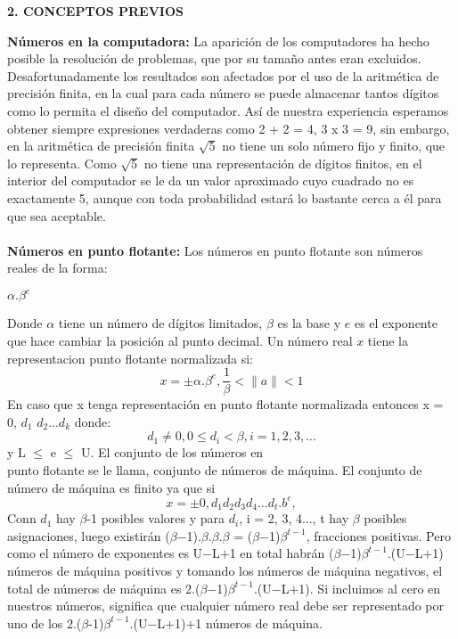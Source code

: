 \documentclass[10pt,a4paper]{article}
\begin{document}
\begin{multicols}{2}
\begin{center}
{\large \bf 2. CONCEPTOS PREVIOS}
\end{center}
\textbf{N\'umeros en la computadora:}
La aparici\'on de los computadores ha hecho posible la resoluci\'on de problemas, que por su tama\~no antes eran excluidos. Desafortunadamente los resultados son afectados por el uso de la aritm\'etica de precisi\'on finita, en la cual para cada n\'umero se puede almacenar tantos d\'igitos como lo permita el dise\~no del computador. As\'i de nuestra experiencia esperamos obtener siempre expresiones verdaderas como 2 + 2 = 4, 3 x 3 = 9, sin embargo, en la aritm\'etica de precisi\'on finita $\sqrt{5}$ no tiene un solo n\'umero fijo y finito, que lo representa. Como $\sqrt{5}$ no tiene una representaci\'on de d\'igitos finitos, en el interior del computador se le da un valor aproximado cuyo cuadrado no es exactamente 5, aunque con toda probabilidad estar\'a lo bastante cerca a \'el para que sea aceptable.\\\\
\textbf{N\'umeros en punto flotante:}
Los n\'umeros en punto flotante son n\'umeros reales de la forma:
\begin{center}{$\alpha$$.$$\beta^{e}$}
\end{center}
Donde $\alpha$ tiene un n\'umero de d\'igitos limitados, $\beta$ es la base y $e$ es el exponente que hace cambiar la posici\'on al punto decimal. Un n\'umero real $x$ tiene la representacion punto flotante normalizada si:
\begin{equation}
x = \pm {\alpha}.{\beta} ^ {e} ,\frac{1}{\beta}  < \|a\| < { 1 }
\end{equation}
En caso que x tenga representaci\'on en punto flotante normalizada entonces x = 0, $d_1$ $d_2$...$d_k$ donde:
\begin{equation}
d_1 \neq 0, {0} \leq {d_i} < {\beta}, i = 1, 2, 3,...
\end{equation}
y L $\leq$ e $\leq$ U. El conjunto de los n\'umeros en\\ punto flotante se le llama, conjunto de n\'umeros de m\'aquina. El conjunto de n\'umero de m\'aquina es finito ya que si
\begin{equation}
x = \pm 0,d_1 d_2 d_3 d_4 ... d_t.b^{e},
\end{equation}
Conn $d_1$ hay $\beta$-1 posibles valores y para $d_i$, i = 2, 3, 4..., t hay $\beta$ posibles asignaciones, luego existir\'an ($\beta$$-$1).$\beta$.$\beta$.$\beta$ = ($\beta$$-$1)$\beta^{t-1}$, fracciones positivas. Pero como el n\'umero de exponentes es U$-$L$+$1 en total habr\'an ($\beta$$-$1)$\beta^{t-1}$.(U$-$L$+$1) n\'umeros de m\'aquina positivos y tomando los n\'umeros de m\'aquina negativos, el total de n\'umeros de m\'aquina es $2$.($\beta$$-$1)$\beta^{t-1}$.(U$-$L$+$1). Si incluimos al cero en nuestros n\'umeros, significa que cualquier n\'umero real debe ser representado por uno de los $2$.($\beta$-1)$\beta^{t-1}$.(U$-$L$+$1)$+$1 n\'umeros de m\'aquina.\\\\

\end{multicols}
\end{document}
